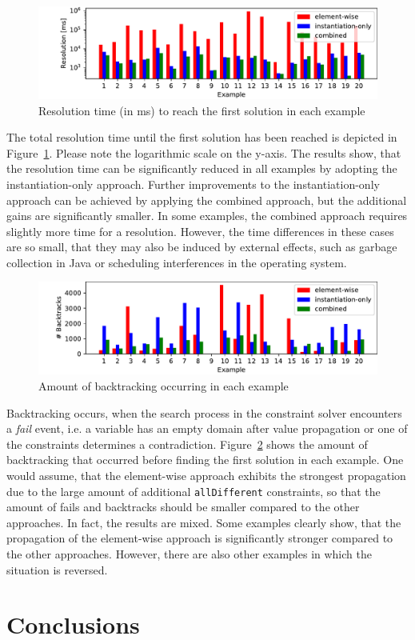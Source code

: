 \documentclass[english,biblatex]{lni}
\begin{document}
\begin{figure}[h!tbp]
\centering
\includegraphics[width=\textwidth]{results-resolution}
\caption{Resolution time (in ms) to reach the first solution in each example}
\label{results-resolution}
\end{figure}

The total resolution time until the first solution has been reached is depicted in Figure~\ref{results-resolution}.
Please note the logarithmic scale on the y-axis.
The results show, that the resolution time can be significantly reduced in all examples by adopting the instantiation-only approach.
Further improvements to the instantiation-only approach can be achieved by applying the combined approach, but the additional gains are significantly smaller.
In some examples, the combined approach requires slightly more time for a resolution.
However, the time differences in these cases are so small, that they may also be induced by external effects, such as garbage collection in Java or scheduling interferences in the operating system.

\begin{figure}[h!tbp]
\centering
\includegraphics[width=\textwidth]{results-backtracks}
\caption{Amount of backtracking occurring in each example}
\label{results-backtracks}
\end{figure}

Backtracking occurs, when the search process in the constraint solver encounters a \emph{fail} event, i.e. a variable has an empty domain after value propagation or one of the constraints determines a contradiction.
Figure~\ref{results-backtracks} shows the amount of backtracking that occurred before finding the first solution in each example.
One would assume, that the element-wise approach exhibits the strongest propagation due to the large amount of additional \texttt{allDifferent} constraints, so that the amount of fails and backtracks should be smaller compared to the other approaches.
In fact, the results are mixed.
Some examples clearly show, that the propagation of the element-wise approach is significantly stronger compared to the other approaches.
However, there are also other examples in which the situation is reversed.

\section{Conclusions}


\printbibliography[heading=bibintoc]
\end{document}
